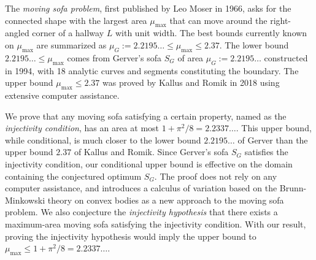 The \emph{moving sofa problem}, first published by Leo Moser in 1966,
asks for the connected shape with the largest area $\mu_{\text{max}}$ that can move around the
right-angled corner of a hallway $L$ with unit width.
The best bounds currently known on $\mu_{\max}$ are summarized as
$\mu_G := 2.2195\ldots \leq \mu_{\max} \leq 2.37$.
The lower bound $2.2195\ldots \leq \mu_{\max}$ comes from Gerver's sofa $S_G$ of area $\mu_G :=
2.2195\ldots$ constructed in 1994, with 18 analytic curves and segments constituting the boundary.
The upper bound $\mu_{\max} \leq 2.37$ was proved by Kallus and Romik in 2018
using extensive computer assistance.

We prove that any moving sofa satisfying a certain property, named as the
\emph{injectivity condition},
has an area at most $1 + \pi^2/8 =
2.2337\ldots$. This upper bound, while conditional, is much closer to the lower bound $2.2195\ldots$
of Gerver than the upper bound $2.37$ of Kallus and Romik. Since Gerver's sofa $S_G$ satisfies the
injectivity condition, our conditional upper bound is effective on the domain containing the
conjectured optimum $S_G$. The proof does not rely on any computer assistance, and introduces a
calculus of variation based on the Brunn-Minkowski theory on convex bodies as a new approach to the
moving sofa problem. We also conjecture the \emph{injectivity hypothesis}
that there exists a maximum-area moving sofa satisfying the injectivity
condition. With our result, proving the injectivity hypothesis would imply the upper bound
to $\mu_{\max} \leq 1 + \pi^2/8 = 2.2337\ldots$.